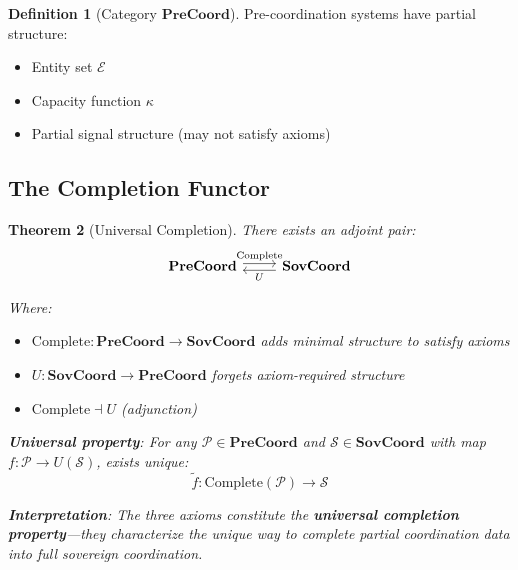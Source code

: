\documentclass[11pt,a4paper]{article}
\newtheorem{theorem}{Theorem}[section]
\theoremstyle{definition}
\newtheorem{definition}[theorem]{Definition}
\theoremstyle{remark}
\newcommand{\E}{\mathcal{E}}
\newcommand{\SovCoord}{\mathbf{SovCoord}}
\begin{document}
\begin{definition}[Category $\mathbf{PreCoord}$]
Pre-coordination systems have partial structure:
\begin{itemize}
\item Entity set $\E$
\item Capacity function $\kappa$
\item Partial signal structure (may not satisfy axioms)
\end{itemize}
\end{definition}

\subsection{The Completion Functor}

\begin{theorem}[Universal Completion]
\label{thm:universal-completion}
There exists an adjoint pair:
\[
\begin{tikzcd}
\mathbf{PreCoord} \arrow[r, shift left, "\text{Complete}"] & 
\SovCoord \arrow[l, shift left, "U"]
\end{tikzcd}
\]

Where:
\begin{itemize}
\item $\text{Complete}: \mathbf{PreCoord} \to \SovCoord$ adds minimal structure to satisfy axioms
\item $U: \SovCoord \to \mathbf{PreCoord}$ forgets axiom-required structure
\item $\text{Complete} \dashv U$ (adjunction)
\end{itemize}

\textbf{Universal property}: For any $\mathcal{P} \in \mathbf{PreCoord}$ and $\mathcal{S} \in \SovCoord$ with map $f: \mathcal{P} \to U(\mathcal{S})$, exists unique:
\[ \tilde{f}: \text{Complete}(\mathcal{P}) \to \mathcal{S} \]

\textbf{Interpretation}: The three axioms constitute the \textbf{universal completion property}—they characterize the unique way to complete partial coordination data into full sovereign coordination.
\end{theorem}
\end{document}
